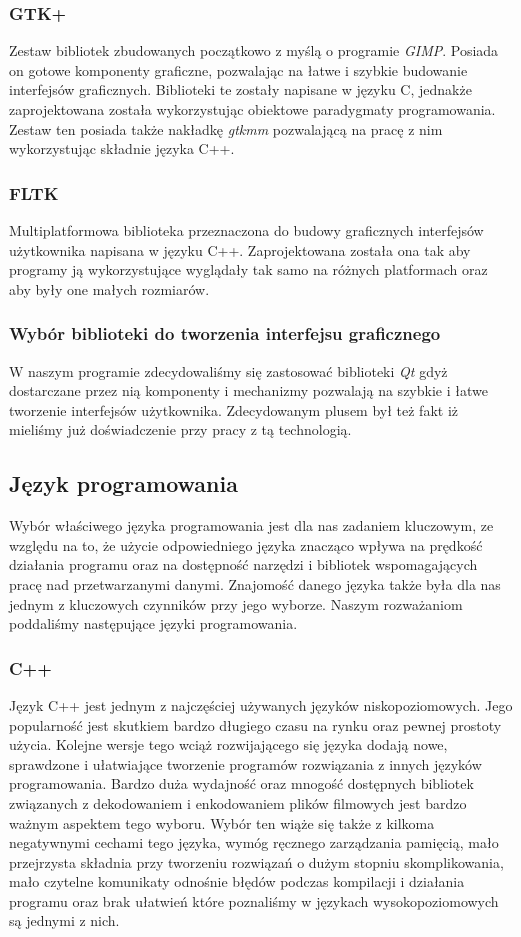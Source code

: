 \documentclass[twoside]{projektInzynierskiMS}
\begin{document}
\subsubsection{GTK+}
Zestaw bibliotek zbudowanych początkowo z myślą o programie \emph{GIMP}. Posiada on gotowe komponenty graficzne, pozwalając na łatwe i szybkie budowanie interfejsów graficznych. Biblioteki te zostały napisane w języku C, jednakże zaprojektowana została wykorzystując obiektowe paradygmaty programowania. Zestaw ten posiada także nakładkę \emph{gtkmm} pozwalającą na pracę z nim wykorzystując składnie języka C++.
\subsubsection{FLTK}
Multiplatformowa biblioteka przeznaczona do budowy graficznych interfejsów użytkownika napisana w języku C++. Zaprojektowana została ona tak aby programy ją wykorzystujące wyglądały tak samo na różnych platformach oraz aby były one małych rozmiarów.
\subsubsection{Wybór biblioteki do tworzenia interfejsu graficznego}
W naszym programie zdecydowaliśmy się zastosować biblioteki \emph{Qt} gdyż dostarczane przez nią komponenty i mechanizmy pozwalają na szybkie i łatwe tworzenie interfejsów użytkownika. Zdecydowanym plusem był też fakt iż mieliśmy już doświadczenie przy pracy z tą technologią.

\subsection{Język programowania}

Wybór właściwego języka programowania jest dla nas zadaniem kluczowym, ze względu na to, że użycie odpowiedniego języka znacząco wpływa na prędkość działania programu oraz na dostępność narzędzi i bibliotek wspomagających pracę nad przetwarzanymi danymi. Znajomość danego języka także była dla nas jednym z kluczowych czynników przy jego wyborze. Naszym rozważaniom poddaliśmy następujące języki programowania.

\subsubsection{C++}
Język C++ jest jednym z najczęściej używanych języków niskopoziomowych. Jego popularność jest skutkiem bardzo długiego czasu na rynku oraz pewnej prostoty użycia. Kolejne wersje tego wciąż rozwijającego się języka dodają nowe, sprawdzone i ułatwiające tworzenie programów rozwiązania z innych języków programowania. Bardzo duża wydajność oraz mnogość dostępnych bibliotek związanych z dekodowaniem i enkodowaniem plików filmowych jest bardzo ważnym aspektem tego wyboru. Wybór ten wiąże się także z kilkoma negatywnymi cechami tego języka, wymóg ręcznego zarządzania pamięcią, mało przejrzysta składnia przy tworzeniu rozwiązań o dużym stopniu skomplikowania, mało czytelne komunikaty odnośnie błędów podczas kompilacji i działania programu oraz brak ułatwień które poznaliśmy w językach wysokopoziomowych są jednymi z nich. 
\end{document}
